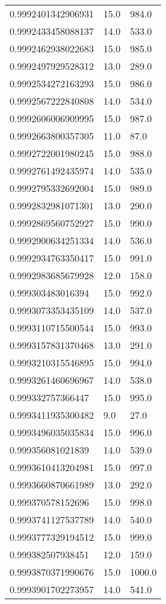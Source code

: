 \begin{center}
\begin{supertabular}[H]{p{0.30\textwidth}p{0.05\textwidth}p{0.05\textwidth}}
0.9992401342906931 & 15.0 & 984.0 \\ 
0.9992433458088137 & 14.0 & 533.0 \\ 
0.9992462938022683 & 15.0 & 985.0 \\ 
0.9992497929528312 & 13.0 & 289.0 \\ 
0.9992534272163293 & 15.0 & 986.0 \\ 
0.9992567222840808 & 14.0 & 534.0 \\ 
0.9992606006909995 & 15.0 & 987.0 \\ 
0.9992663800357305 & 11.0 & 87.0 \\ 
0.9992722001980245 & 15.0 & 988.0 \\ 
0.9992761492435974 & 14.0 & 535.0 \\ 
0.9992795332692004 & 15.0 & 989.0 \\ 
0.9992832981071301 & 13.0 & 290.0 \\ 
0.9992869560752927 & 15.0 & 990.0 \\ 
0.9992900634251334 & 14.0 & 536.0 \\ 
0.9992934763350417 & 15.0 & 991.0 \\ 
0.9992983685679928 & 12.0 & 158.0 \\ 
0.999303483016394 & 15.0 & 992.0 \\ 
0.9993073353435109 & 14.0 & 537.0 \\ 
0.9993110715500544 & 15.0 & 993.0 \\ 
0.9993157831370468 & 13.0 & 291.0 \\ 
0.9993210315546895 & 15.0 & 994.0 \\ 
0.9993261460696967 & 14.0 & 538.0 \\ 
0.999332757366447 & 15.0 & 995.0 \\ 
0.9993411935300482 & 9.0 & 27.0 \\ 
0.9993496035035834 & 15.0 & 996.0 \\ 
0.999356081021839 & 14.0 & 539.0 \\ 
0.9993610413204981 & 15.0 & 997.0 \\ 
0.9993660870661989 & 13.0 & 292.0 \\ 
0.999370578152696 & 15.0 & 998.0 \\ 
0.9993741127537789 & 14.0 & 540.0 \\ 
0.9993777329194512 & 15.0 & 999.0 \\ 
0.999382507938451 & 12.0 & 159.0 \\ 
0.9993870371990676 & 15.0 & 1000.0 \\ 
0.9993901702273957 & 14.0 & 541.0 \\ 

\end{supertabular}
\end{center}
